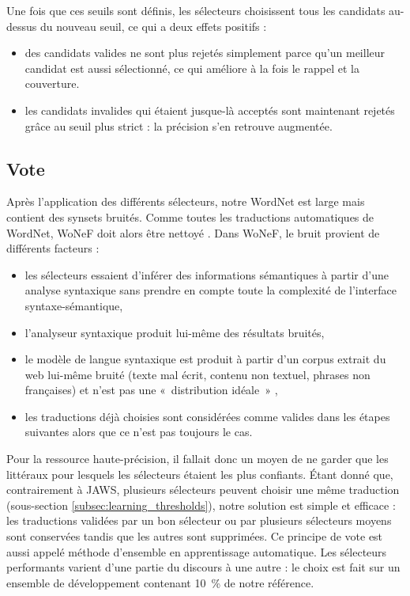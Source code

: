 Une fois que ces seuils sont définis, les sélecteurs choisissent tous les candidats au-dessus du nouveau seuil, ce qui a deux effets positifs :

\begin{itemize}
    \item des candidats valides ne sont plus rejetés simplement parce qu'un meilleur candidat est aussi sélectionné, ce qui améliore à la fois le rappel et la couverture.
    \item les candidats invalides qui étaient jusque-là acceptés sont maintenant rejetés grâce au seuil plus strict : la précision s'en retrouve augmentée.
\end{itemize}

\subsection{Vote}
\label{subsec:voting}

Après l'application des différents sélecteurs, notre WordNet est large mais contient des synsets bruités. Comme toutes les traductions automatiques de WordNet, WoNeF doit alors être nettoyé \citep{sagot2012cleaning}. Dans WoNeF, le bruit provient de différents facteurs :

\begin{itemize}
    \item les sélecteurs essaient d'inférer des informations sémantiques à partir d'une analyse syntaxique sans prendre en compte toute la complexité de l'interface syntaxe-sémantique,
    \item l'analyseur syntaxique produit lui-même des résultats bruités,
    \item le modèle de langue syntaxique est produit à partir d'un corpus extrait du web lui-même bruité (texte mal écrit, contenu non textuel, phrases non françaises) et n'est pas une «~distribution idéale~» \citep{copestake2012lexicalised},
    \item les traductions déjà choisies sont considérées comme valides dans les étapes suivantes alors que ce n'est pas toujours le cas.
\end{itemize}

Pour la ressource haute-précision, il fallait donc un moyen de ne garder que les littéraux pour lesquels les sélecteurs étaient les plus confiants. Étant donné que, contrairement à JAWS, plusieurs sélecteurs peuvent choisir une même traduction (sous-section \ref{subsec:learning_thresholds}), notre solution est simple et efficace : les traductions validées par un bon sélecteur ou par plusieurs sélecteurs moyens sont conservées tandis que les autres sont supprimées. Ce principe de vote est aussi appelé méthode d'ensemble en apprentissage automatique. Les sélecteurs performants varient d'une partie du discours à une autre : le choix est fait sur un ensemble de développement contenant 10~\% de notre référence.

